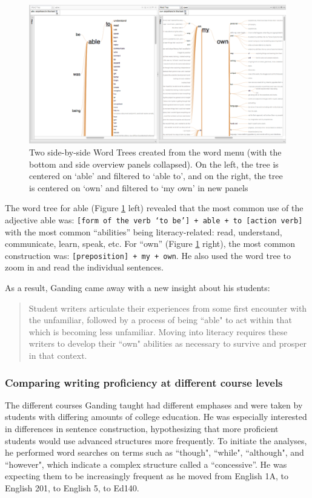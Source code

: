 \documentclass{sig-alternate}
\newcommand{\code}[1] {\texttt{#1}}
\begin{document}
\begin{figure}[h!]
\includegraphics[width=\textwidth]{fig/rex/04.png}
\caption{ Two side-by-side Word Trees created from the word menu (with the bottom and side overview panels collapsed). On the left, the tree is centered on `able' and filtered to `able to', and on the right, the tree is centered on  `own' and filtered to `my own' in new panels \label{fig:rex04}}
\end{figure}

The word tree for able (Figure \ref{fig:rex04} left) revealed that the most common use of the adjective able was: \code{[form of the verb `to be'] + able + to [action verb]} with the most common ``abilities'' being literacy-related: read, understand, communicate, learn, speak, etc.  For ``own'' (Figure \ref{fig:rex04} right), the most common construction was: \code{[preposition] + my + own}.  He also used the word tree to zoom in and read the individual sentences.

As a result, Ganding came away with a new insight about his students:
\begin{quote}
Student writers articulate their experiences from some first encounter with the unfamiliar, followed by a process of being ``able" to act within that which is becoming less unfamiliar.  Moving into literacy requires these writers to develop their ``own" abilities as necessary to survive and prosper in that context.
\end{quote} 

\subsubsection{Comparing writing proficiency at different course levels}
The different courses Ganding taught had different emphases and were taken by students with differing amounts of college education. He was especially interested in differences in sentence construction, hypothesizing that more proficient students would use advanced structures more frequently. To initiate the analyses, he performed word searches on terms such as ``though", ``while", ``although", and ``however", which indicate a complex structure called a ``concessive''. He was expecting them to be increasingly frequent as he moved from English 1A, to English 201, to English 5, to Ed140.
\end{document}
